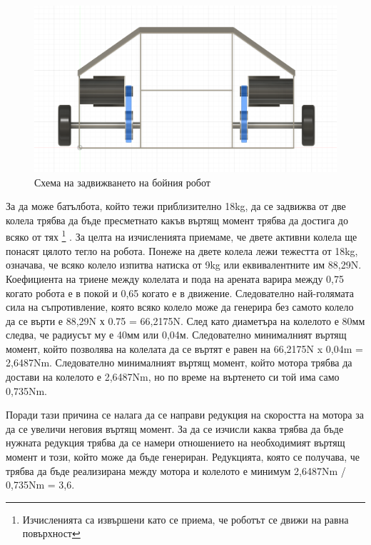 \begin{figure}[H]
    \centering
    \includegraphics[width=\linewidth]{images/motion.png}
    
    \caption{Схема на задвижването на бойния робот}
    \label{fig:motion} 
\end{figure}

За да може батълбота, който тежи приблизително 18kg, да се задвижва от две колела трябва да бъде пресметнато какъв въртящ момент трябва да достига до всяко от тях
\footnote{Изчисленията са извършени като се приема, че роботът се движи на равна повърхност}
. За целта на изчисленията приемаме, че двете активни колела ще понасят цялото тегло на робота. Понеже на двете колела лежи тежестта от 18kg, означава, че всяко колело изпитва натиска от 9kg или еквивалентните им 88,29N. Коефициента на триене между колелата и пода на арената варира между 0,75 когато робота е в покой и 0,65 когато е в движение. Следователно най-голямата сила на съпротивление, която всяко колело може да генерира без самото колело да се върти е 88,29N х 0.75 = 66,2175N. След като диаметъра на колелото е 80мм следва, че радиусът му е 40мм или 0,04м. Следователно минималният въртящ момент, който позволява на колелата да се въртят е равен на 66,2175N x 0,04m = 2,6487Nm. Следователно минималният въртящ момент, който мотора трябва да достави на колелото е 2,6487Nm, но по време на въртенето си той има само 0,735Nm.

Поради тази причина се налага да се направи редукция на скоростта на мотора за да се увеличи неговия въртящ момент. За да се изчисли каква трябва да бъде нужната редукция трябва да се намери отношението на необходимият въртящ момент и този, който може да бъде генериран. Редукцията, която се получава, че трябва да бъде реализирана между мотора и колелото е минимум 2,6487Nm / 0,735Nm = 3,6.

